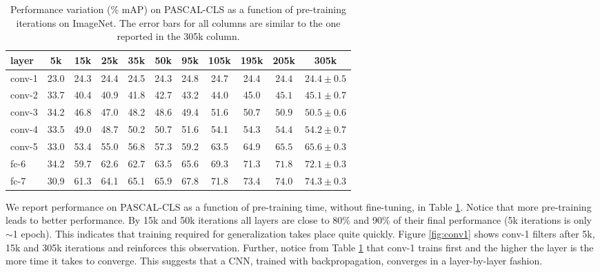 \setlength{\tabcolsep}{4pt}
\begin{table}[t!]
\begin{center}
\caption{Performance variation (\% mAP) on PASCAL-CLS as a function of pre-training iterations on ImageNet. The error bars  for all columns are similar to the one reported in the 305k column.}
\label{table:det-traj-classify}
\vspace{0.3em}
\begin{tabular}{lcccccccccc}
layer  & 5k & 15k & 25k & 35k & 50k & 95k & 105k & 195k & 205k & 305k \\
\hline
conv-1 & 23.0 & 24.3 & 24.4 & 24.5 & 24.3 & 24.8 & 24.7 & 24.4 & $24.4$  & $24.4 \pm 0.5$ \\
conv-2 & 33.7 & 40.4 & 40.9 & 41.8 & 42.7 & 43.2 & 44.0 & 45.0 & $45.1$  & $45.1 \pm 0.7$ \\
conv-3 & 34.2 & 46.8 & 47.0 & 48.2 & 48.6 & 49.4 & 51.6 & 50.7 & $50.9$  & $50.5 \pm 0.6$ \\
conv-4 & 33.5 & 49.0 & 48.7 & 50.2 & 50.7 & 51.6 & 54.1 & 54.3 & $54.4$  & $54.2 \pm 0.7$ \\
conv-5 & 33.0 & 53.4 & 55.0 & 56.8 & 57.3 & 59.2 & 63.5 & 64.9 & $65.5$  & $65.6 \pm 0.3 $ \\
fc-6   & 34.2 & 59.7 & 62.6 & 62.7 & 63.5 & 65.6 & 69.3 & 71.3 & $71.8$  & $72.1 \pm 0.3 $\\
fc-7   & 30.9 & 61.3 & 64.1 & 65.1 & 65.9 & 67.8 & 71.8 & 73.4 & $74.0$  & $74.3 \pm 0.3 $\\
\end{tabular}
\end{center}
\end{table}
\setlength{\tabcolsep}{1.4pt}

We report performance on PASCAL-CLS as a function of pre-training time, without fine-tuning, in Table \ref{table:det-traj-classify}. Notice that more pre-training leads to better performance. By 15k and 50k iterations all layers are close to 80\% and  90\% of their final performance (5k iterations is only $\sim$1 epoch). This indicates that training required for generalization takes place quite quickly. Figure \ref{fig:conv1} shows conv-1 filters after 5k, 15k and 305k iterations and reinforces this observation. Further, notice from Table \ref{table:det-traj-classify} that conv-1 trains first and the higher the layer is the more time it takes to converge. This suggests that a CNN, trained with backpropagation, converges in a layer-by-layer fashion.   


